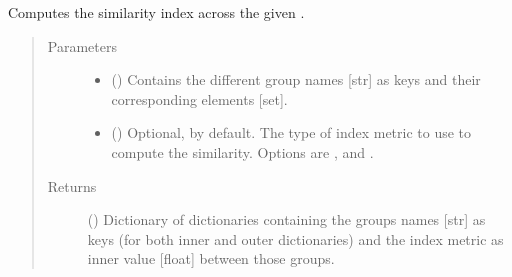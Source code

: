 \documentclass[letterpaper,10pt,english]{sphinxmanual}
\begin{document}
\begin{fulllineitems}
\begin{fulllineitems}
\end{fulllineitems}


\begin{fulllineitems}
\label{\detokenize{main:pypath.main.PyPath.signor_pathways}}
\end{fulllineitems}


\begin{fulllineitems}
\label{\detokenize{main:pypath.main.PyPath.similarity_groups}}
Computes the similarity index across the given .
\begin{quote}\begin{description}
\item[{Parameters}] \leavevmode\begin{itemize}
\item {} 
 () \textendash{} Contains the different group names {[}str{]} as keys and their
corresponding elements {[}set{]}.

\item {} 
 () \textendash{} Optional,  by default. The type of index metric
to use to compute the similarity. Options are ,
 and .

\end{itemize}

\item[{Returns}] \leavevmode
() \textendash{} Dictionary of dictionaries containing the groups
names {[}str{]} as keys (for both inner and outer dictionaries)
and the index metric as inner value {[}float{]} between those
groups.

\end{description}\end{quote}

\end{fulllineitems}


\end{fulllineitems}
\end{document}
